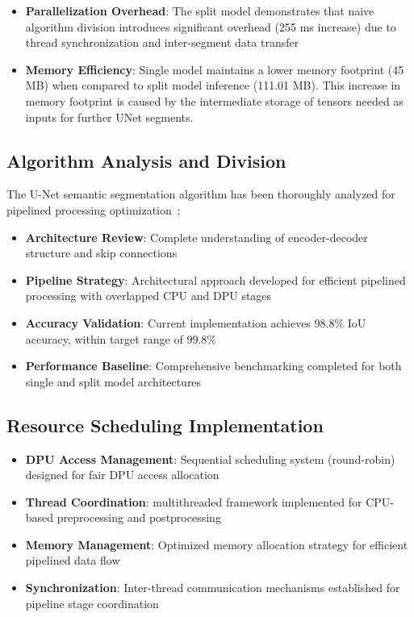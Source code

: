 \begin{itemize}
\item \textbf{Parallelization Overhead}: The split model demonstrates that naive algorithm division introduces significant overhead (255 ms increase) due to thread synchronization and inter-segment data transfer
\item \textbf{Memory Efficiency}: Single model maintains a lower memory footprint (45 MB) when compared to split model inference (111.01 MB). This increase in memory footprint is caused by the intermediate storage of tensors needed as inputs for further UNet segments.
\end{itemize}

\subsection{Algorithm Analysis and Division}\label{subsec:algorithm-analysis}

The U-Net semantic segmentation algorithm has been thoroughly analyzed for pipelined processing optimization~\cite{zhao2023parallel}:

\begin{itemize}
\item \textbf{Architecture Review}: Complete understanding of encoder-decoder structure and skip connections
\item \textbf{Pipeline Strategy}: Architectural approach developed for efficient pipelined processing with overlapped CPU and DPU stages
\item \textbf{Accuracy Validation}: Current implementation achieves 98.8\% IoU accuracy, within target range of 99.8\%~\cite{wang2021}
\item \textbf{Performance Baseline}: Comprehensive benchmarking completed for both single and split model architectures
\end{itemize}

\subsection{Resource Scheduling Implementation}\label{subsec:scheduling-implementation}

\begin{itemize}
\item \textbf{DPU Access Management}: Sequential scheduling system (round-robin) designed for fair DPU access allocation
\item \textbf{Thread Coordination}: multithreaded framework implemented for CPU-based preprocessing and postprocessing~\cite{park2022thread}
\item \textbf{Memory Management}: Optimized memory allocation strategy for efficient pipelined data flow~\cite{chen2022memory}
\item \textbf{Synchronization}: Inter-thread communication mechanisms established for pipeline stage coordination
\end{itemize}

